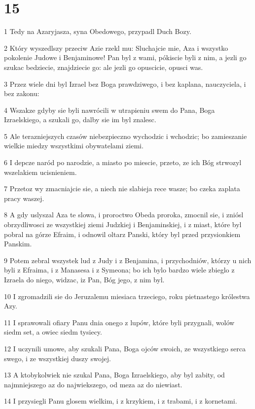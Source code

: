 \chapter{15}

\par 1 Tedy na Azaryjasza, syna Obedowego, przypadl Duch Bozy.
\par 2 Który wyszedlszy przeciw Azie rzekl mu: Sluchajcie mie, Aza i wszystko pokolenie Judowe i Benjaminowe! Pan byl z wami, pókiscie byli z nim, a jezli go szukac bedziecie, znajdziecie go: ale jezli go opuscicie, opusci was.
\par 3 Przez wiele dni byl Izrael bez Boga prawdziwego, i bez kaplana, nauczyciela, i bez zakonu:
\par 4 Wszakze gdyby sie byli nawrócili w utrapieniu swem do Pana, Boga Izraelskiego, a szukali go, dalby sie im byl znalesc.
\par 5 Ale terazniejszych czasów niebezpieczno wychodzic i wchodzic; bo zamieszanie wielkie miedzy wszystkimi obywatelami ziemi.
\par 6 I depcze naród po narodzie, a miasto po miescie, przeto, ze ich Bóg strwozyl wszelakiem ucisnieniem.
\par 7 Przetoz wy zmacniajcie sie, a niech nie slabieja rece wasze; bo czeka zaplata pracy waszej.
\par 8 A gdy uslyszal Aza te slowa, i proroctwo Obeda proroka, zmocnil sie, i zniósl obrzydliwosci ze wszystkiej ziemi Judzkiej i Benjaminskiej, i z miast, które byl pobral na górze Efraim, i odnowil oltarz Panski, który byl przed przysionkiem Panskim.
\par 9 Potem zebral wszystek lud z Judy i z Benjamina, i przychodniów, którzy u nich byli z Efraima, i z Manasesa i z Symeona; bo ich bylo bardzo wiele zbieglo z Izraela do niego, widzac, iz Pan, Bóg jego, z nim byl.
\par 10 I zgromadzili sie do Jeruzalemu miesiaca trzeciego, roku pietnastego królestwa Azy.
\par 11 I sprawowali ofiary Panu dnia onego z lupów, które byli przygnali, wolów siedm set, a owiec siedm tysiecy.
\par 12 I uczynili umowe, aby szukali Pana, Boga ojców swoich, ze wszystkiego serca swego, i ze wszystkiej duszy swojej.
\par 13 A ktobykolwiek nie szukal Pana, Boga Izraelskiego, aby byl zabity, od najmniejszego az do najwiekszego, od meza az do niewiast.
\par 14 I przysiegli Panu glosem wielkim, i z krzykiem, i z trabami, i z kornetami.
